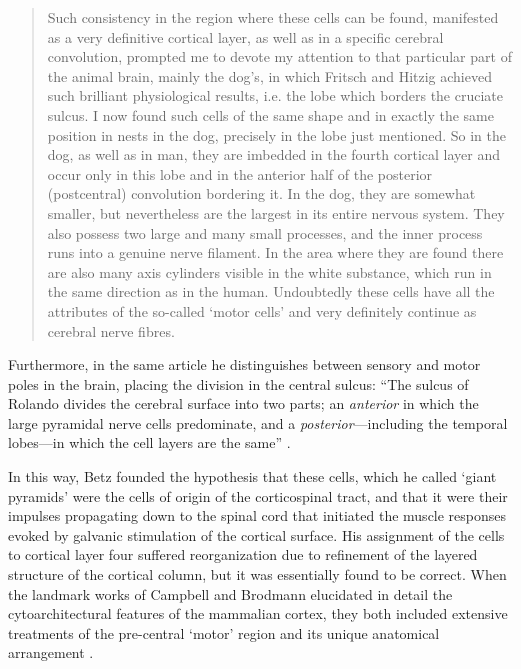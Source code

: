\blockquote[{\protect\cite{Betz1874, Kushchayev2012}}]{Such consistency in the region where these cells can be found, manifested as a very definitive cortical layer, as well as in a specific cerebral convolution, prompted me to devote my attention to that particular part of the animal brain, mainly the dog’s, in which Fritsch and Hitzig achieved such brilliant physiological results, i.e. the lobe which borders the cruciate sulcus. I now found such cells of the same shape and in exactly the same position in nests in the dog, precisely in the lobe just mentioned. So in the dog, as well as in man, they are imbedded in the fourth cortical layer and occur only in this lobe and in the anterior half of the posterior (postcentral) convolution bordering it. In the dog, they are somewhat smaller, but nevertheless are the largest in its entire nervous system. They also possess two large and many small processes, and the inner process runs into a genuine nerve filament. In the area where they are found there are also many axis cylinders visible in the white substance, which run in the same direction as in the human. Undoubtedly these cells have all the attributes of the so-called ‘motor cells’ and very definitely continue as cerebral nerve fibres.}

Furthermore, in the same article he distinguishes between sensory and motor poles in the brain, placing the division in the central sulcus: ``The sulcus of Rolando divides the cerebral surface into two parts; an \emph{anterior} in which the large pyramidal nerve cells predominate, and a \emph{posterior}---including the temporal lobes---in which the cell layers are the same'' \cite{Betz1874,Clarke1996}.

In this way, Betz founded the hypothesis that these cells, which he called ‘giant pyramids’ were the cells of origin of the corticospinal tract, and that it were their impulses propagating down to the spinal cord that initiated the muscle responses evoked by galvanic stimulation of the cortical surface. His assignment of the cells to cortical layer four suffered reorganization due to refinement of the layered structure of the cortical column, but it was essentially found to be correct. When the landmark works of Campbell and Brodmann elucidated in detail the cytoarchitectural features of the mammalian cortex, they both included extensive treatments of the pre-central ‘motor’ region and its unique anatomical arrangement \cite{Campbell1905,Brodmann1909}. 

